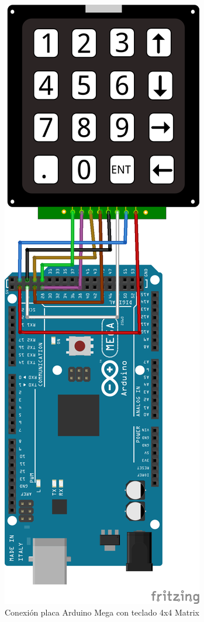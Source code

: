 \documentclass[11pt,twoside]{book}
\begin{document}
\begin{figure}[H]
	\begin{center}
		\includegraphics[scale=0.8]{images/conexionArduinoKeypad.png}
	\end{center}
	\caption{Conexión placa Arduino Mega con teclado 4x4 Matrix}
	\label{fig:ConexionESP8266}
\end{figure}
\end{document}
